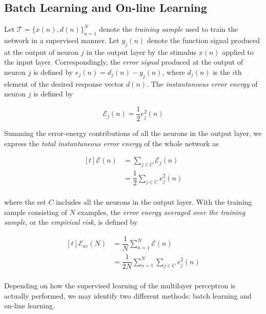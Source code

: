 \documentclass[twocolumn]{article}
\begin{document}
 \subsection{Batch Learning and On-line Learning}

	 Let $ \mathcal{T} = \{ x(n), d(n) \}_{n = 1}^{N} $ denote the \textit{training sample} used to train the network in a supervised manner. Let $ y_{j}(n) $ denote the function signal produced at the output of neuron $ j $ in the output layer by the stimulus $ x(n) $ applied to the input layer. Correspondingly, the \textit{error signal} produced at the output of neuron $ j $ is defined by $ e_{j}(n) = d_{j} (n) - y_{j} (n) $, where $ d_{j} (n) $ is the $ i $th element of the desired response vector $ d(n) $. The \textit{instantaneous error energy} of neuron $ j $ is defined by

	 $$ \mathcal{E}_{j} (n) = \dfrac{1}{2} e^{2}_{j} (n) $$

	 Summing the error-energy contributions of all the neurons in the output layer, we express the \textit{total instantaneous error energy} of the whole network as

	 $$ \begin{aligned}[t]
			 \mathcal{E} (n) & = \sum_{j \in C} \mathcal{E}_{j} (n)       \\
			                 & = \dfrac{1}{2}\sum_{j \in C} e^{2}_{j} (n) \\
		 \end{aligned} $$

	 \noindent where the set $ C $ includes all the neurons in the output layer. With the training sample consisting of $ N $ examples, the \textit{error energy averaged over the training sample}, or the \textit{empirical risk}, is defined by

	 $$ \begin{aligned}[t]
			 \mathcal{E}_{av} (N) & = \dfrac{1}{N} \sum_{n = 1}^{N} \mathcal{E} (n)             \\
			                      & = \dfrac{1}{2N} \sum_{n = 1}^{N}\sum_{j \in C}e_{j}^{2} (n) \\
		 \end{aligned} $$

	 Depending on how the supervised learning of the multilayer perceptron is actually performed, we may identify two different methods: batch learning and on-line learning.
\end{document}
